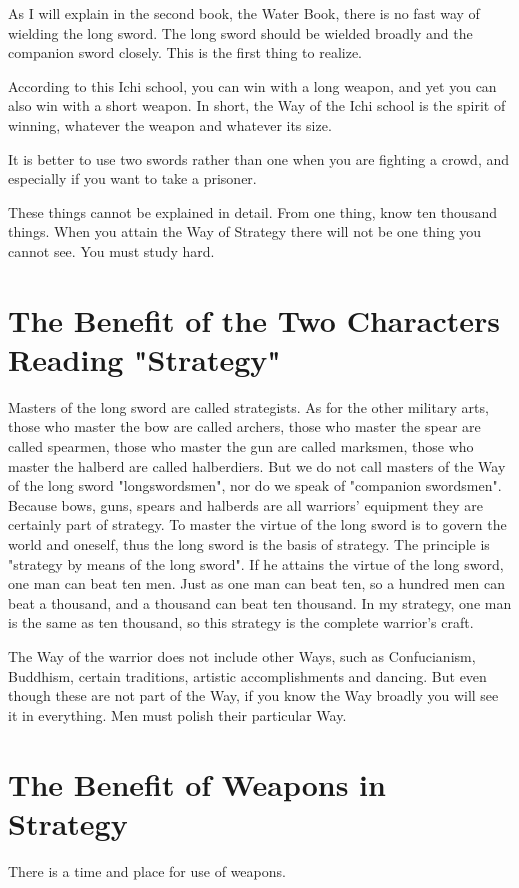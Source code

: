 \documentclass[12pt]{report}
\begin{document}
As I will explain in the second book, the Water Book, there is no fast way of wielding the long sword. The long sword should be wielded broadly and the companion sword closely. This is the first thing to realize.

According to this Ichi school, you can win with a long weapon, and yet you can also win with a short weapon. In short, the Way of the Ichi school is the spirit of winning, whatever the weapon and whatever its size.

It is better to use two swords rather than one when you are fighting a crowd, and especially if you want to take a prisoner.

These things cannot be explained in detail. From one thing, know ten thousand things. When you attain the Way of Strategy there will not be one thing you cannot see. You must study hard.
\section*{The Benefit of the Two Characters Reading "Strategy"}
Masters of the long sword are called strategists. As for the other military arts, those who master the bow are called archers, those who master the spear are called spearmen, those who master the gun are called marksmen, those who master the halberd are called halberdiers. But we do not call masters of the Way of the long sword "longswordsmen", nor do we speak of "companion swordsmen". Because bows, guns, spears and halberds are all warriors' equipment they are certainly part of strategy. To master the virtue of the long sword is to govern the world and oneself, thus the long sword is the basis of strategy. The principle is "strategy by means of the long sword". If he attains the virtue of the long sword, one man can beat ten men. Just as one man can beat ten, so a hundred men can beat a thousand, and a thousand can beat ten thousand. In my strategy, one man is the same as ten thousand, so this strategy is the complete warrior's craft.

The Way of the warrior does not include other Ways, such as Confucianism, Buddhism, certain traditions, artistic accomplishments and dancing. But even though these are not part of the Way, if you know the Way broadly you will see it in everything. Men must polish their particular Way.
\section*{The Benefit of Weapons in Strategy}
There is a time and place for use of weapons.
\end{document}
